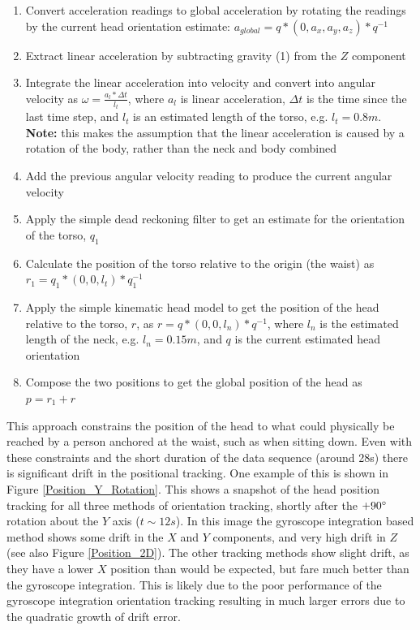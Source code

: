 \documentclass[11pt,a4paper]{article}
\begin{document}
	\begin{enumerate}[noitemsep]
		\item Convert acceleration readings to global acceleration by rotating the readings by the current head orientation estimate: $a_{global}=q*(0, a_x, a_y, a_z)*q^{-1}$
		\item Extract linear acceleration by subtracting gravity (1) from the $Z$ component
		\item Integrate the linear acceleration into velocity and convert into angular velocity as $\omega=\frac{a_l*\Delta t}{l_t}$, where $a_l$ is linear acceleration, $\Delta t$ is the time since the last time step, and $l_t$ is an estimated length of the torso, e.g. $l_t=0.8m$.
		\textbf{Note:} this makes the assumption that the linear acceleration is caused by a rotation of the body, rather than the neck and body combined
		\item Add the previous angular velocity reading to produce the current angular velocity
		\item Apply the simple dead reckoning filter to get an estimate for the orientation of the torso, $q_1$
		\item Calculate the position of the torso relative to the origin (the waist) as $r_1=q_1*(0,0,l_t)*q_1^{-1}$
		\item Apply the simple kinematic head model to get the position of the head relative to the torso, $r$, as $r=q*(0,0,l_n)*q^{-1}$, where $l_n$ is the estimated length of the neck, e.g. $l_n=0.15m$, and $q$ is the current estimated head orientation
		\item Compose the two positions to get the global position of the head as $p=r_1+r$
	\end{enumerate}

	This approach constrains the position of the head to what could physically be reached by a person anchored at the waist, such as when sitting down. Even with these constraints and the short duration of the data sequence (around 28s) there is significant drift in the positional tracking. One example of this is shown in Figure \ref{Position_Y_Rotation}. This shows a snapshot of the head position tracking for all three methods of orientation tracking, shortly after the $+90\degree$ rotation about the $Y$ axis ($t\sim12s$). In this image the gyroscope integration based method shows some drift in the $X$ and $Y$ components, and very high drift in $Z$ (see also Figure \ref{Position_2D}). The other tracking methods show slight drift, as they have a lower $X$ position than would be expected, but fare much better than the gyroscope integration. This is likely due to the poor performance of the gyroscope integration orientation tracking resulting in much larger errors due to the quadratic growth of drift error.
	
\end{document}
